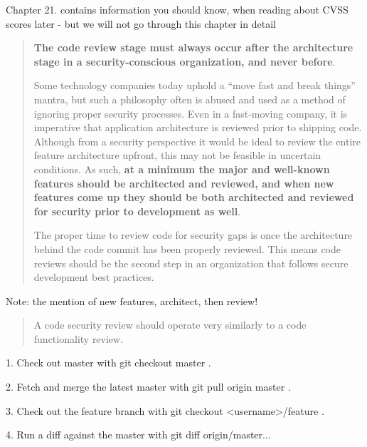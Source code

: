 \documentclass[Screen16to9,17pt]{foils}
\begin{document}
Chapter 21. contains information you should know, when reading about CVSS scores later - but we will not go through this chapter in detail



\begin{quote} {\bf
The code review stage must always occur after the architecture stage in a security-conscious organization, and never before}.

Some technology companies today uphold a “move fast and break things” mantra, but such a philosophy often is abused and used as a method of ignoring proper security processes. Even in a fast-moving company, it is imperative that application architecture is reviewed prior to shipping code. Although from a security perspective it would be ideal to review the entire feature architecture upfront, this may not be feasible in uncertain conditions. As such, {\bf at a minimum the major and well-known features should be architected and reviewed, and when new features come up they should be both architected and reviewed for security prior to development as well}.

The proper time to review code for security gaps is once the architecture behind the code commit has been properly reviewed. This means code reviews should be the second step in an organization that follows secure development best practices.
\end{quote}

\begin{list2}
\item Note: the mention of new features, architect, then review!
\end{list2}




\begin{quote}
A code security review should operate very similarly to a code functionality review.
\end{quote}

\begin{list2}
\item[1.] Check out master with git checkout master .
\item[2.] Fetch and merge the latest master with git pull origin master .
\item[3.] Check out the feature branch with git checkout <username>/feature .
\item[4.] Run a diff against the master with git diff origin/master...
\end{list2}
\end{document}
